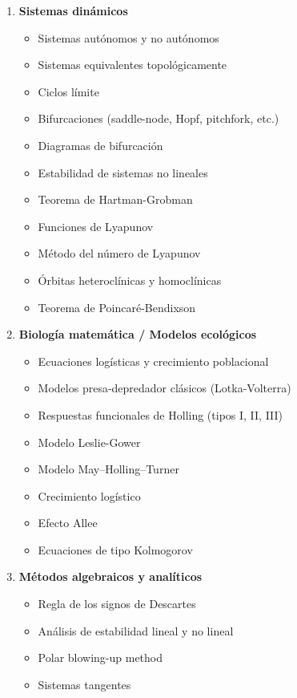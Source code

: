 \begin{enumerate}
	\item \textbf{Sistemas dinámicos}
	\begin{itemize}
		\item Sistemas autónomos y no autónomos \checkmark
		\item Sistemas equivalentes topológicamente \checkmark
		\item Ciclos límite \checkmark
		\item Bifurcaciones (saddle-node, Hopf, pitchfork, etc.)
		\item Diagramas de bifurcación
		\item Estabilidad de sistemas no lineales
		\item Teorema de Hartman-Grobman \checkmark
		\item Funciones de Lyapunov
		\item Método del número de Lyapunov
		\item Órbitas heteroclínicas y homoclínicas
		\item Teorema de Poincaré-Bendixson
	\end{itemize}
	
	\item \textbf{Biología matemática / Modelos ecológicos}
	\begin{itemize}
		\item Ecuaciones logísticas y crecimiento poblacional
		\item Modelos presa-depredador clásicos (Lotka-Volterra)
		\item Respuestas funcionales de Holling (tipos I, II, III)
		\item Modelo Leslie-Gower
		\item Modelo May–Holling–Turner
		\item Crecimiento logístico
		\item Efecto Allee
		\item Ecuaciones de tipo Kolmogorov
	\end{itemize}
	
	\item \textbf{Métodos algebraicos y analíticos}
	\begin{itemize}
		\item Regla de los signos de Descartes
		\item Análisis de estabilidad lineal y no lineal
		\item Polar blowing-up method
		\item Sistemas tangentes
	\end{itemize}
\end{enumerate}

